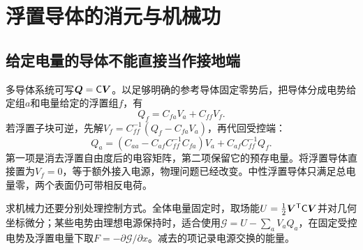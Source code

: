 \section{浮置导体的消元与机械功}
\subsection{给定电量的导体不能直接当作接地端}
多导体系统可写$\bm{Q}=\mathsf C\bm{V}$。以足够明确的参考导体固定零势后，把导体分成电势给定组$a$和电量给定的浮置组$f$，有
\[
 Q_f=C_{fa}V_a+C_{ff}V_f.
\]
若浮置子块可逆，先解$V_f=C_{ff}^{-1}(Q_f-C_{fa}V_a)$，再代回受控端：
\[
 Q_a=(C_{aa}-C_{af}C_{ff}^{-1}C_{fa})V_a
 +C_{af}C_{ff}^{-1}Q_f.
\]
第一项是消去浮置自由度后的电容矩阵，第二项保留它的预存电量。将浮置导体直接置为$V_f=0$，等于额外接入电源，物理问题已经改变。中性浮置导体只满足总电量零，两个表面仍可带相反电荷。

求机械力还要分别处理控制方式。全体电量固定时，取场能$U=\tfrac12\bm{V}^{\mathsf T}\mathsf C\bm{V}$并对几何坐标微分；某些电势由理想电源保持时，适合使用$\mathcal G=U-\sum_{a}V_aQ_a$，在固定受控电势及浮置电量下取$F=-\partial\mathcal G/\partial x$。减去的项记录电源交换的能量。

